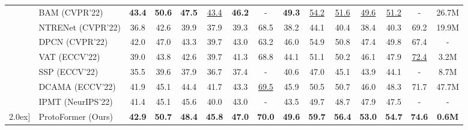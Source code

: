 \documentclass[journal]{IEEEtran}
\begin{document}
\begin{table*}
\begin{center}
{\begin{tabular}{cl|cccccc|cccccc|c}
            & BAM (CVPR'22)\cite{bam} & \textbf{43.4} & \textbf{50.6} & \textbf{47.5} & \underline{43.4} & \textbf{46.2} & - & \textbf{49.3} & \underline{54.2} & \underline{51.6} & \underline{49.6} & \underline{51.2} & - & 26.7M \\
            
            & NTRENet (CVPR'22)\cite{ntrenet} & 36.8 & 42.6 & 39.9 & 37.9 & 39.3 & 68.5 & 38.2 & 44.1 & 40.4 & 38.4 & 40.3 & 69.2 & 19.9M \\
            
            & DPCN (CVPR'22)\cite{dpcn} & 42.0 & 47.0 & 43.3 & 39.7 & 43.0 & 63.2 & 46.0 & 54.9 & 50.8 & 47.4 & 49.8 & 67.4 & - \\
            
            & VAT (ECCV'22)\cite{vat} & 39.0 & 43.8 & 42.6 & 39.7 & 41.3 & 68.8 & 44.1 & 51.1 & 50.2 & 46.1 & 47.9 & \underline{72.4} & 3.2M \\
            
            & SSP (ECCV'22)\cite{ssp}& 35.5 & 39.6 & 37.9 & 36.7 & 37.4 & - & 40.6 & 47.0 & 45.1 & 43.9 & 44.1 & - & 8.7M \\
            
            & DCAMA (ECCV'22)\cite{dcama} & 41.9 & 45.1 & 44.4 & 41.7 & 43.3 & \underline{69.5} & 45.9 & 50.5 & 50.7 & 46.0 & 48.3 & 71.7 &47.7M \\
            
            & IPMT (NeurIPS'22)\cite{ipmt} & 41.4 & 45.1 & 45.6 & 40.0 & 43.0 & - & 43.5 & 49.7 & 48.7 & 47.9 & 47.5 & - & - \\
            \cline{2-15} \-2.0ex]
            & ProtoFormer (Ours) & \textbf{42.9} & \textbf{50.7} & \textbf{48.4} & \textbf{45.8} & \textbf{47.0} & \textbf{70.0} & \textbf{49.6} & \textbf{59.7} & \textbf{56.4} & \textbf{53.0} & \textbf{54.7} & \textbf{74.6} & \textbf{0.6M} \\
            \bottomrule
    \end{tabular}
    }
    \vspace{-2.0mm}
    \end{center}
\end{table*}
\end{document}
